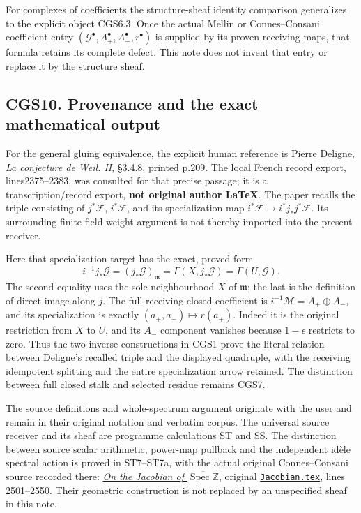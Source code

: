 For complexes of coefficients the structure-sheaf identity comparison
generalizes to the explicit object CGS6.3. Once the actual Mellin or
Connes--Consani coefficient entry
\((\mathcal G^\bullet,A_+^\bullet,A_-^\bullet,r^\bullet)\) is supplied
by its proven receiving maps, that formula retains its complete defect.
This note does not invent that entry or replace it by the structure
sheaf.

\subsection{CGS10. Provenance and the exact mathematical
output}\label{cgs10.-provenance-and-the-exact-mathematical-output}

For the general gluing equivalence, the explicit human reference is
Pierre Deligne,
\href{https://www.numdam.org/item/PMIHES_1980__52__137_0/}{\emph{La
conjecture de Weil. II}}, §3.4.8, printed p.209. The local
\href{https://www.numdam.org/item/PMIHES_1980__52__137_0/}{French
record export}, lines2375--2383, was consulted for that precise passage;
it is a transcription/record export, \textbf{not original author LaTeX}.
The paper recalls the triple consisting of \(j^*\mathcal F\),
\(i^*\mathcal F\), and its specialization map
\(i^*\mathcal F\to i^*j_*j^*\mathcal F\). Its surrounding finite-field
weight argument is not thereby imported into the present receiver.

Here that specialization target has the exact, proved form \[
 i^{-1}j_*\mathcal G
 =(j_*\mathcal G)_{\mathfrak m}
 =\Gamma(X,j_*\mathcal G)
 =\Gamma(U,\mathcal G).
\tag{CGS10.1}
\] The second equality uses the sole neighbourhood \(X\) of
\(\mathfrak m\); the last is the definition of direct image along \(j\).
The full receiving closed coefficient is
\(i^{-1}\mathcal M=A_+\oplus A_-\), and its specialization is exactly
\((a_+,a_-)\mapsto r(a_+)\). Indeed it is the original restriction from
\(X\) to \(U\), and its \(A_-\) component vanishes because
\(1-\epsilon\) restricts to zero. Thus the two inverse constructions in
CGS1 prove the literal relation between Deligne's recalled triple and
the displayed quadruple, with the receiving idempotent splitting and the
entire specialization arrow retained. The distinction between full
closed stalk and selected residue remains CGS7.

The source definitions and whole-spectrum argument originate with the
user and remain in their original notation and verbatim corpus. The
universal source receiver and its sheaf are programme calculations ST
and SS. The distinction between source scalar arithmetic, power-map
pullback and the independent idèle spectral action is proved in
ST7--ST7a, with the actual original Connes--Consani source recorded
there: \href{https://arxiv.org/abs/2602.15941v1}{\emph{On the Jacobian
of \(\overline{\operatorname{Spec}\mathbb Z}\)}}, original
\href{https://arxiv.org/abs/2602.15941v1}{\nolinkurl{Jacobian.tex}}, lines 2501--2550. Their
geometric construction is not replaced by an unspecified sheaf in this
note.

